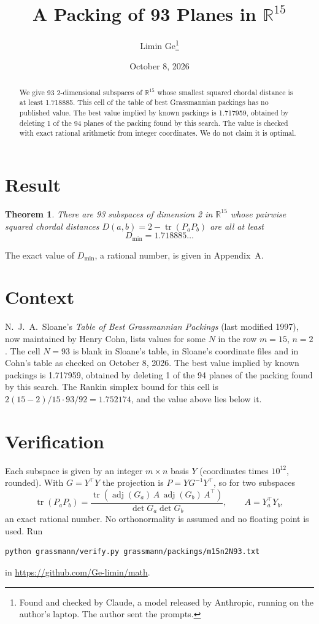 \documentclass[11pt,a4paper]{article}
\title{A Packing of 93 Planes in $\mathbb{R}^{15}$}
\author{Limin Ge\thanks{Found and checked by Claude, a model released by Anthropic, running on the author's laptop. The author sent the prompts.}}
\date{October 8, 2026}
\newtheorem*{theorem}{Theorem}
\begin{document}
\maketitle
\begin{abstract}
We give 93 2-dimensional subspaces of $\mathbb{R}^{15}$ whose smallest squared chordal distance is at least 1.718885. This cell of the table of best Grassmannian packings has no published value. The best value implied by known packings is 1.717959, obtained by deleting 1 of the 94 planes of the packing found by this search. The value is checked with exact rational arithmetic from integer coordinates. We do not claim it is optimal.
\end{abstract}

\section{Result}
\begin{theorem}
There are 93 subspaces of dimension 2 in $\mathbb{R}^{15}$ whose pairwise squared chordal distances $D(a,b) = 2 - \operatorname{tr}(P_aP_b)$ are all at least
\[ D_{\min} = 1.718885\ldots \]
\end{theorem}
The exact value of $D_{\min}$, a rational number, is given in Appendix~A.


\section{Context}
N.~J.~A.~Sloane's \emph{Table of Best Grassmannian Packings} (last modified 1997), now maintained by Henry Cohn, lists values for some $N$ in the row $m=15$, $n=2$. The cell $N=93$ is blank in Sloane's table, in Sloane's coordinate files and in Cohn's table as checked on October 8, 2026. The best value implied by known packings is 1.717959, obtained by deleting 1 of the 94 planes of the packing found by this search. The Rankin simplex bound for this cell is $2(15-2)/15\cdot 93/92 = 1.752174$, and the value above lies below it.


\section{Verification}
Each subspace is given by an integer $m\times n$ basis $Y$ (coordinates times $10^{12}$, rounded). With $G=Y^\top Y$ the projection is $P=YG^{-1}Y^\top$, so for two subspaces
\[ \operatorname{tr}(P_aP_b)=\frac{\operatorname{tr}(\operatorname{adj}(G_a)\,A\,\operatorname{adj}(G_b)\,A^\top)}{\det G_a\det G_b},\qquad A=Y_a^\top Y_b, \]
an exact rational number. No orthonormality is assumed and no floating point is used. Run
\begin{verbatim}
python grassmann/verify.py grassmann/packings/m15n2N93.txt
\end{verbatim}
in \url{https://github.com/Ge-limin/math}.
\end{document}
